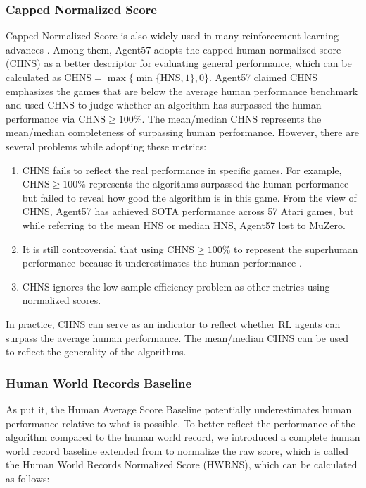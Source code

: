 \documentclass[nohyperref]{article}
\theoremstyle{plain}
\begin{document}
\subsubsection{Capped Normalized Score}
Capped Normalized Score is also widely used in many reinforcement learning advances \citep{atarihuman,agent57}. Among them, Agent57 \citep{agent57} adopts the capped human normalized score (CHNS) as a better descriptor for evaluating general performance, which can be calculated as $\mathrm{CHNS}=\max \{\min \{\mathrm{HNS}, 1\}, 0\}$. Agent57 claimed CHNS emphasizes the games that are below the average human performance benchmark and used CHNS to judge whether an algorithm has surpassed the human performance via $\mathrm{CHNS} \geq 100\%$.  The mean/median CHNS represents the mean/median completeness of surpassing human performance. However, there are several problems while adopting 
these metrics:
\begin{enumerate}
    \item CHNS fails to reflect the real performance in specific games. For example, $\mathrm{CHNS} \geq 100\%$ represents the algorithms surpassed the human performance but failed to reveal how good the algorithm is in this game. From the view of CHNS, Agent57 \citep{agent57} has achieved SOTA performance across 57 Atari games, but while referring to the mean HNS or median HNS, Agent57 lost to MuZero.
    \item It is still controversial that using $\mathrm{CHNS} \geq 100\%$ to represent the superhuman performance because it underestimates the human performance \citep{atarihuman}.
    \item CHNS ignores the low sample efficiency problem as other metrics using normalized scores.
\end{enumerate}

In practice, CHNS can serve as an indicator to reflect whether RL agents can surpass the average human performance. The mean/median CHNS can be used to reflect the generality of the algorithms.

\subsubsection{Human World Records Baseline}
As \citep{atarihuman} put it, the Human Average Score Baseline potentially underestimates human performance relative to what is possible. To better reflect the performance of the algorithm compared to the human world record, we introduced a complete human world record baseline extended from \citep{dreamerv2,atarihuman} to normalize the raw score, which is called the Human World Records Normalized Score (HWRNS), which can be calculated as follows:
\end{document}
